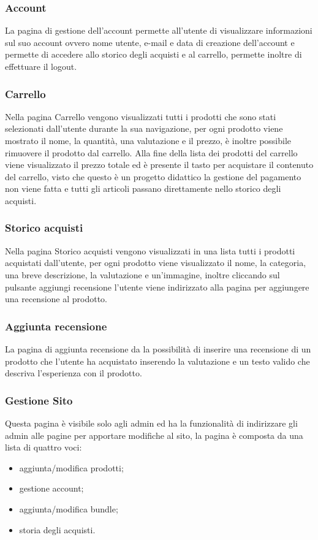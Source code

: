 \subsubsection{Account}
La pagina di gestione dell'account permette all'utente di visualizzare informazioni sul suo account ovvero nome utente, e-mail e data di creazione dell'account e permette di accedere allo storico degli acquisti e al carrello, permette inoltre di effettuare il logout.

\subsubsection{Carrello}
Nella pagina Carrello vengono visualizzati tutti i prodotti che sono stati selezionati dall'utente durante la sua navigazione, per ogni prodotto viene mostrato il nome, la quantità, una valutazione e il prezzo, è inoltre possibile rimuovere il prodotto dal carrello.\newline
Alla fine della lista dei prodotti del carrello viene visualizzato il prezzo totale ed è presente il tasto per acquistare il contenuto del carrello, visto che questo è un progetto didattico la gestione del pagamento non viene fatta e tutti gli articoli passano direttamente nello storico degli acquisti.

\subsubsection{Storico acquisti}
Nella pagina Storico acquisti vengono visualizzati in una lista tutti i prodotti acquistati dall'utente, per ogni prodotto viene visualizzato il nome, la categoria, una breve descrizione, la valutazione e un'immagine, inoltre cliccando sul pulsante aggiungi recensione l'utente viene indirizzato alla pagina per aggiungere una recensione al prodotto.

\subsubsection{Aggiunta recensione}
La pagina di aggiunta recensione da la possibilità di inserire una recensione di un prodotto che l'utente ha acquistato inserendo la valutazione e un testo valido che descriva l'esperienza con il prodotto.

\subsubsection{Gestione Sito}
Questa pagina è visibile solo agli admin ed ha la funzionalità di indirizzare gli admin alle pagine per apportare modifiche al sito, la pagina è composta da una lista di quattro voci:
\begin{itemize}
	\item aggiunta/modifica prodotti;
	\item gestione account;
	\item aggiunta/modifica bundle;
	\item storia degli acquisti.
\end{itemize}

